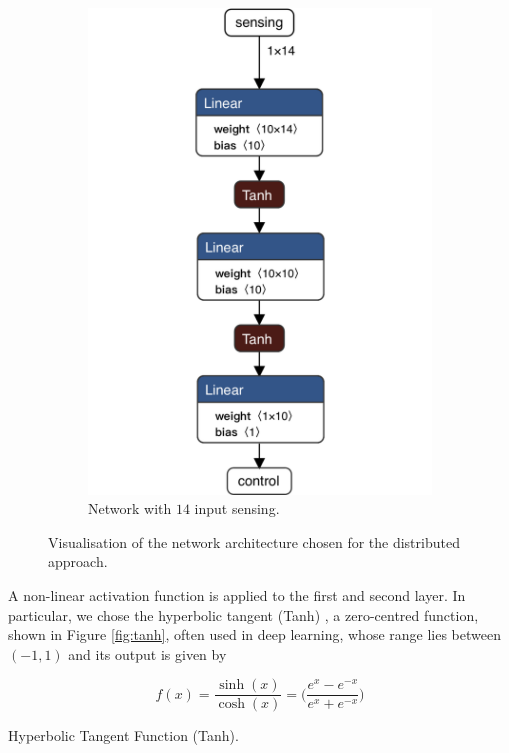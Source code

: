 \begin{figure}[htb]
\begin{subfigure}[h]{0.495\textwidth}
		\includegraphics[width=.8\textwidth]{contents/images/task1distributed_all@4x}
		\caption{Network with $14$ input sensing.}
		\label{fig:singlenet-d14distributed1}
	\end{subfigure}
	\caption[Network architectures for the distributed approach.]{Visualisation of 
		the network architecture chosen for the distributed approach.}
	\label{fig:singlenetdistributed1}
\end{figure}

A non-linear activation function is applied to the first and second layer. 
In particular, we chose the hyperbolic tangent (Tanh) 
\cite[see][]{kalman1992tanh}, a zero-centred function, shown in Figure 
\ref{fig:tanh}, often used in deep learning, whose range lies between $(-1, 1)$ 
and its output is given by

\begin{Equation}[H]
	\centering
	\begin{equation}
	f(x)= \frac{\sinh (x)}{\cosh (x)} = \bigg( \frac{e^x - e^{-x}}{e^x + 
		e^{-x}}\bigg)
	\end{equation}
	\caption{Hyperbolic Tangent Function (Tanh).}
	\label{eq:tanh}
\end{Equation}

